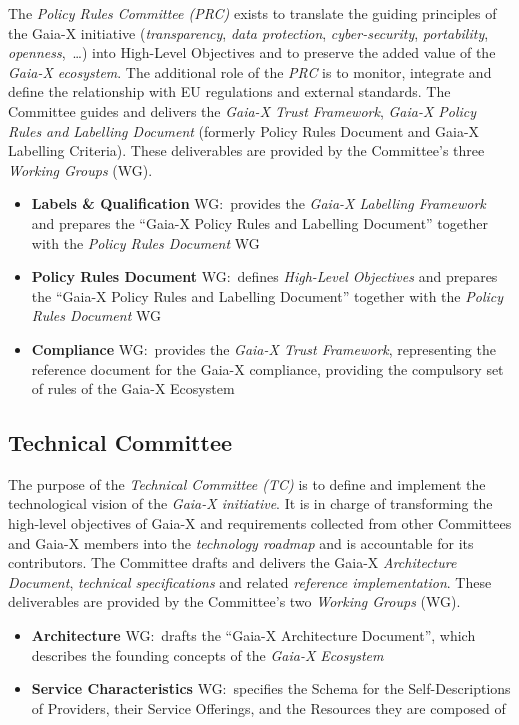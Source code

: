 The \textit{Policy Rules Committee (PRC)} exists to translate the guiding principles of the Gaia-X initiative (\textit{transparency}, \textit{data protection}, \textit{cyber-security}, \textit{portability}, \textit{openness},~\ldots) into High-Level Objectives and to preserve the added value of the \textit{Gaia-X ecosystem}\cite{gaiax}.
The additional role of the \textit{PRC} is to monitor, integrate and define the relationship with EU regulations and external standards.
The Committee guides and delivers the \textit{Gaia-X Trust Framework}, \textit{Gaia-X Policy Rules and Labelling Document} (formerly Policy Rules Document and Gaia-X Labelling Criteria).
These deliverables are provided by the Committee's three \textit{Working Groups} (WG).
\begin{itemize}
    \item \textbf{Labels \& Qualification} WG:~provides the \textit{Gaia-X Labelling Framework} and prepares the ``Gaia-X Policy Rules and Labelling Document'' together with the \textit{Policy Rules Document} WG
    \item \textbf{Policy Rules Document} WG:~defines \textit{High-Level Objectives} and prepares the ``Gaia-X Policy Rules and Labelling Document'' together with the \textit{Policy Rules Document} WG
    \item \textbf{Compliance} WG:~provides the \textit{Gaia-X Trust Framework}, representing the reference document for the Gaia-X compliance, providing the compulsory set of rules of the Gaia-X Ecosystem
\end{itemize}

\subsection{Technical Committee}\label{subsec:technical-committee}

The purpose of the \textit{Technical Committee (TC)} is to define and implement the technological vision of the \textit{Gaia-X initiative}\cite{gaiax}.
It is in charge of transforming the high-level objectives of Gaia-X and requirements collected from other Committees and Gaia-X members into the \textit{technology roadmap} and is accountable for its contributors.
The Committee drafts and delivers the Gaia-X \textit{Architecture Document}, \textit{technical specifications} and related \textit{reference implementation}.
These deliverables are provided by the Committee's two \textit{Working Groups} (WG).
\begin{itemize}
    \item \textbf{Architecture} WG:~drafts the ``Gaia-X Architecture Document'', which describes the founding concepts of the \textit{Gaia-X Ecosystem}
    \item \textbf{Service Characteristics} WG:~specifies the Schema for the Self-Descriptions of Providers, their Service Offerings, and the Resources they are composed of
\end{itemize}


